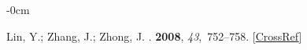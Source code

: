 \documentclass[metals,article,accept,pdftex,moreauthors]{Definitions/mdpi}
\begin{document}
\begin{adjustwidth}{-\extralength}{0cm}
\begin{thebibliography}{999}
Lin, Y.; Zhang, J.; Zhong, J.
.
 {\bf 2008}, {\em 43},~752--758. [\href{http://dx.doi.org/10.1016/j.commatsci.2008.01.039}{CrossRef}]

\end{thebibliography}


%


\PublishersNote{}
\end{adjustwidth}
\end{document}

